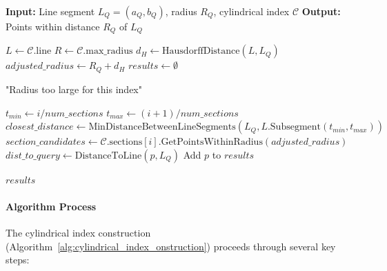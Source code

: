 \documentclass[numbers,sort]{article}
\begin{document}
\begin{algorithm}
\caption{Cylinder Search}
\label{alg:cylindrical_index_search}
\begin{algorithmic}[1]
\STATE \textbf{Input:} Line segment $L_Q = (a_Q, b_Q)$, radius $R_Q$, cylindrical index $\mathcal{C}$
\STATE \textbf{Output:} Points within distance $R_Q$ of $L_Q$

\STATE $L \leftarrow \mathcal{C}.\text{line}$ 
\STATE $R \leftarrow \mathcal{C}.\text{max\_radius}$ 
\STATE $d_H \leftarrow \text{HausdorffDistance}(L, L_Q)$ 
\STATE $adjusted\_radius \leftarrow R_Q + d_H$ 
\STATE $results \leftarrow \emptyset$

    \RETURN "Radius too large for this index"
\ENDIF

    \STATE $t_{min} \leftarrow i / num\_sections$
    \STATE $t_{max} \leftarrow (i+1) / num\_sections$
    \STATE $closest\_distance \leftarrow \text{MinDistanceBetweenLineSegments}(L_Q, L.\text{Subsegment}(t_{min}, t_{max}))$
        \STATE $section\_candidates \leftarrow \mathcal{C}.\text{sections}[i].\text{GetPointsWithinRadius}(adjusted\_radius)$
            \STATE $dist\_to\_query \leftarrow \text{DistanceToLine}(p, L_Q)$
                \STATE Add $p$ to $results$
            \ENDIF
        \ENDFOR
    \ENDIF
\ENDFOR

\RETURN $results$
\end{algorithmic}
\end{algorithm}

\paragraph{Algorithm Process} The cylindrical index construction (Algorithm~\ref{alg:cylindrical_index_onstruction}) proceeds through several key steps:
\end{document}

